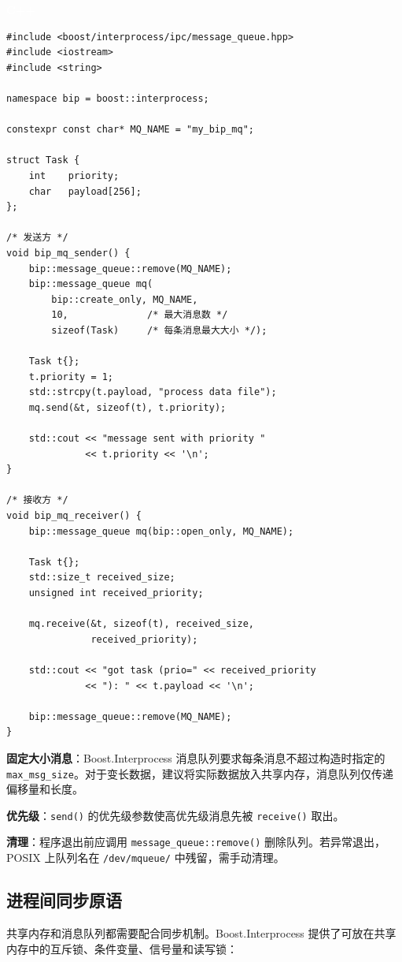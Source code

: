 \documentclass[12pt,a4paper,fontset=fandol]{ctexbook}
\newcommand{\Tp}[1]{\texttt{#1}}
\newcommand{\cpplabel}{%
  \noindent\begin{tcolorbox}[sharp corners,colback=algheadbg,colframe=algheadbg,
    left=6pt,right=6pt,top=2pt,bottom=2pt,boxrule=0pt]
  \textcolor{white}{\small\bfseries\sffamily C++}\end{tcolorbox}%
}
\begin{document}
\cpplabel
\begin{lstlisting}
#include <boost/interprocess/ipc/message_queue.hpp>
#include <iostream>
#include <string>

namespace bip = boost::interprocess;

constexpr const char* MQ_NAME = "my_bip_mq";

struct Task {
    int    priority;
    char   payload[256];
};

/* 发送方 */
void bip_mq_sender() {
    bip::message_queue::remove(MQ_NAME);
    bip::message_queue mq(
        bip::create_only, MQ_NAME,
        10,              /* 最大消息数 */
        sizeof(Task)     /* 每条消息最大大小 */);

    Task t{};
    t.priority = 1;
    std::strcpy(t.payload, "process data file");
    mq.send(&t, sizeof(t), t.priority);

    std::cout << "message sent with priority "
              << t.priority << '\n';
}

/* 接收方 */
void bip_mq_receiver() {
    bip::message_queue mq(bip::open_only, MQ_NAME);

    Task t{};
    std::size_t received_size;
    unsigned int received_priority;

    mq.receive(&t, sizeof(t), received_size,
               received_priority);

    std::cout << "got task (prio=" << received_priority
              << "): " << t.payload << '\n';

    bip::message_queue::remove(MQ_NAME);
}
\end{lstlisting}

\begin{bestpractice}[title=消息队列设计要点]
\textbf{固定大小消息}：Boost.Interprocess 消息队列要求每条消息不超过构造时指定的 \Tp{max\_msg\_size}。对于变长数据，建议将实际数据放入共享内存，消息队列仅传递偏移量和长度。

\textbf{优先级}：\Tp{send()} 的优先级参数使高优先级消息先被 \Tp{receive()} 取出。

\textbf{清理}：程序退出前应调用 \Tp{message\_queue::remove()} 删除队列。若异常退出，POSIX 上队列名在 \texttt{/dev/mqueue/} 中残留，需手动清理。
\end{bestpractice}

\subsection{进程间同步原语}

共享内存和消息队列都需要配合同步机制。Boost.Interprocess 提供了可放在共享内存中的互斥锁、条件变量、信号量和读写锁：
\end{document}
